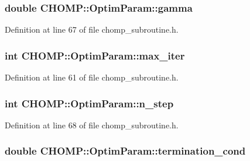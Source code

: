\subsubsection[{\texorpdfstring{gamma}{gamma}}]{\setlength{\rightskip}{0pt plus 5cm}double C\+H\+O\+M\+P\+::\+Optim\+Param\+::gamma}\hypertarget{struct_c_h_o_m_p_1_1_optim_param_a08dbedf3d695dd849e99972eeda4854a}{}\label{struct_c_h_o_m_p_1_1_optim_param_a08dbedf3d695dd849e99972eeda4854a}


Definition at line 67 of file chomp\+\_\+subroutine.\+h.

\subsubsection[{\texorpdfstring{max\+\_\+iter}{max_iter}}]{\setlength{\rightskip}{0pt plus 5cm}int C\+H\+O\+M\+P\+::\+Optim\+Param\+::max\+\_\+iter}\hypertarget{struct_c_h_o_m_p_1_1_optim_param_a0ede8f165be67dd3607e47fa90ed9c31}{}\label{struct_c_h_o_m_p_1_1_optim_param_a0ede8f165be67dd3607e47fa90ed9c31}


Definition at line 61 of file chomp\+\_\+subroutine.\+h.

\subsubsection[{\texorpdfstring{n\+\_\+step}{n_step}}]{\setlength{\rightskip}{0pt plus 5cm}int C\+H\+O\+M\+P\+::\+Optim\+Param\+::n\+\_\+step}\hypertarget{struct_c_h_o_m_p_1_1_optim_param_ac6dafdf330d8f879009f461a77b41c63}{}\label{struct_c_h_o_m_p_1_1_optim_param_ac6dafdf330d8f879009f461a77b41c63}


Definition at line 68 of file chomp\+\_\+subroutine.\+h.

\subsubsection[{\texorpdfstring{termination\+\_\+cond}{termination_cond}}]{\setlength{\rightskip}{0pt plus 5cm}double C\+H\+O\+M\+P\+::\+Optim\+Param\+::termination\+\_\+cond}\hypertarget{struct_c_h_o_m_p_1_1_optim_param_afb3b23647f1698f1815f4f877ac302ea}{}\label{struct_c_h_o_m_p_1_1_optim_param_afb3b23647f1698f1815f4f877ac302ea}


